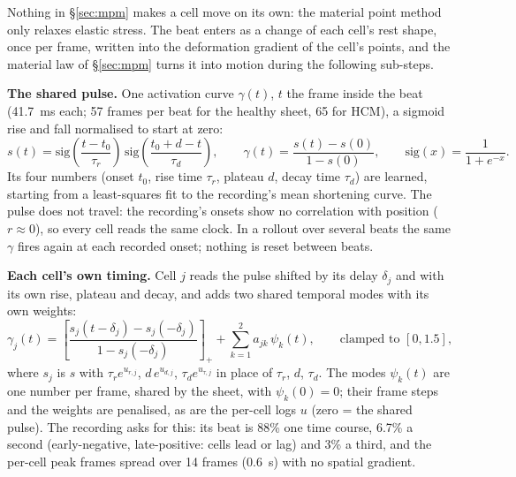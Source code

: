 \documentclass[10pt]{article}
\begin{document}
Nothing in \S\ref{sec:mpm} makes a cell move on its own: the material point method only relaxes elastic stress.
The beat enters as a change of each cell's rest shape, once per frame, written into the deformation gradient of
the cell's points, and the material law of \S\ref{sec:mpm} turns it into motion during the following sub-steps.

\textbf{The shared pulse.} One activation curve $\gamma(t)$, $t$ the frame inside the beat (41.7~ms each; 57
frames per beat for the healthy sheet, 65 for HCM), a sigmoid rise and fall normalised to start at zero:
\[ s(t) = \mathrm{sig}\!\left(\frac{t - t_0}{\tau_r}\right)\,\mathrm{sig}\!\left(\frac{t_0 + d - t}{\tau_d}\right), \qquad
   \gamma(t) = \frac{s(t) - s(0)}{1 - s(0)}, \qquad \mathrm{sig}(x) = \frac{1}{1 + e^{-x}} . \]
Its four numbers (onset $t_0$, rise time $\tau_r$, plateau $d$, decay time $\tau_d$) are learned, starting from a
least-squares fit to the recording's mean shortening curve. The pulse does not travel: the recording's onsets
show no correlation with position ($r \approx 0$), so every cell reads the same clock. In a rollout over several
beats the same $\gamma$ fires again at each recorded onset; nothing is reset between beats.

\textbf{Each cell's own timing.} Cell $j$ reads the pulse shifted by its delay $\delta_j$ and with its own rise,
plateau and decay, and adds two shared temporal modes with its own weights:
\[ \gamma_j(t) = \left[\frac{s_j(t - \delta_j) - s_j(-\delta_j)}{1 - s_j(-\delta_j)}\right]_+ + \sum_{k=1}^{2} a_{jk}\,\psi_k(t),
   \qquad \text{clamped to } [0, 1.5], \]
where $s_j$ is $s$ with $\tau_r e^{u_{r,j}}$, $d\, e^{u_{d,j}}$, $\tau_d e^{u_{\tau,j}}$ in place of $\tau_r$, $d$,
$\tau_d$. The modes $\psi_k(t)$ are one number per frame, shared by the sheet, with $\psi_k(0) = 0$; their frame
steps and the weights are penalised, as are the per-cell logs $u$ (zero = the shared pulse). The recording asks for
this: its beat is 88\% one time course, 6.7\% a second (early-negative, late-positive: cells lead or lag) and 3\% a
third, and the per-cell peak frames spread over 14 frames (0.6~s) with no spatial gradient.
\end{document}
